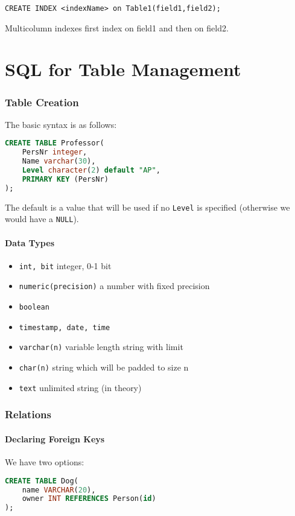 \documentclass{article}
\renewcommand{\t}[1]{\texttt{#1}}
\begin{document}
\t{CREATE INDEX <indexName> on Table1(field1,field2);}

Multicolumn indexes first index on field1 and then on field2.




\part{SQL for Table Management}

\section*{Table Creation}
The basic syntax is as follows:
\begin{lstlisting}[language=SQL]
CREATE TABLE Professor(
	PersNr integer,
	Name varchar(30),
	Level character(2) default "AP",
	PRIMARY KEY (PersNr)
);
\end{lstlisting}
The default is a value that will be used if no \t{Level} is specified (otherwise we would have a \t{NULL}).

\subsection*{Data Types}

\begin{itemize}
	\item \t{int, bit} integer, 0-1 bit
	\item \t{numeric(precision)} a number with fixed precision
	\item \t{boolean} 
	\item \t{timestamp, date, time}
	\item \t{varchar(n)} variable length string with limit
	\item \t{char(n)} string which will be padded to size n
	\item \t{text} unlimited string (in theory)
\end{itemize}

\section*{Relations}

\subsection*{Declaring Foreign Keys}

We have two options:
\begin{lstlisting}[language=SQL]
CREATE TABLE Dog(
	name VARCHAR(20),
	owner INT REFERENCES Person(id)
);
\end{lstlisting}
\end{document}

